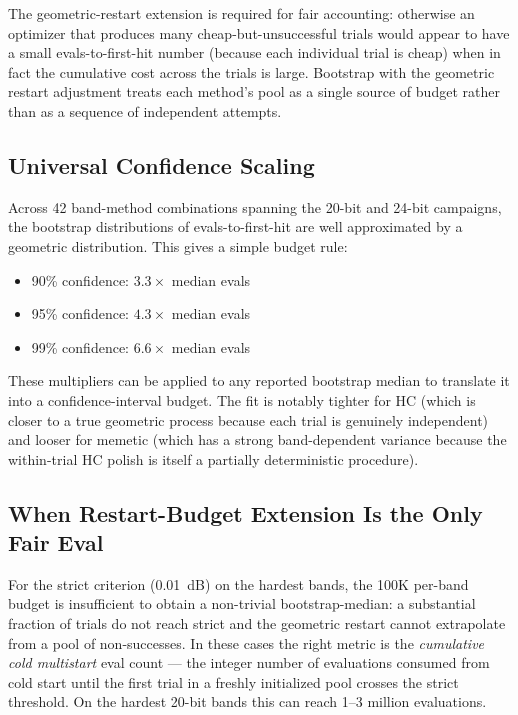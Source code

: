 The geometric-restart extension is required for fair accounting:
otherwise an optimizer that produces many cheap-but-unsuccessful
trials would appear to have a small evals-to-first-hit number
(because each individual trial is cheap) when in fact the cumulative
cost across the trials is large. Bootstrap with the geometric
restart adjustment treats each method's pool as a single source of
budget rather than as a sequence of independent attempts.

\subsection{Universal Confidence Scaling}

Across 42 band-method combinations spanning the 20-bit and 24-bit
campaigns, the bootstrap distributions of evals-to-first-hit are
well approximated by a geometric distribution. This gives a simple
budget rule:
\begin{itemize}
\item 90\% confidence: $3.3\times$ median evals
\item 95\% confidence: $4.3\times$ median evals
\item 99\% confidence: $6.6\times$ median evals
\end{itemize}
These multipliers can be applied to any reported bootstrap median
to translate it into a confidence-interval budget. The fit is
notably tighter for HC (which is closer to a true geometric process
because each trial is genuinely independent) and looser for memetic
(which has a strong band-dependent variance because the within-trial
HC polish is itself a partially deterministic procedure).

\subsection{When Restart-Budget Extension Is the Only Fair Eval}

For the strict criterion (0.01~dB) on the hardest bands, the 100K
per-band budget is insufficient to obtain a non-trivial
bootstrap-median: a substantial fraction of trials do not reach
strict and the geometric restart cannot extrapolate from a pool of
non-successes. In these cases the right metric is the
\emph{cumulative cold multistart} eval count --- the integer number
of evaluations consumed from cold start until the first trial in a
freshly initialized pool crosses the strict threshold. On the
hardest 20-bit bands this can reach 1--3 million evaluations.


